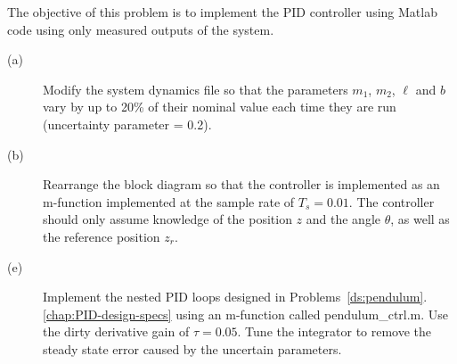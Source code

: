 The objective of this problem is to implement the PID controller using Matlab code using only measured outputs of the system.
\begin{description}
\item[(a)]  Modify the system dynamics file so that the parameters $m_1$, $m_2$, $\ell$ and $b$ vary by up to 20\% of their nominal value each time they are run (uncertainty parameter = 0.2).
\item[(b)]  Rearrange the block diagram so that the controller is implemented as an m-function implemented at the sample rate of $T_s=0.01$.  The controller should only assume knowledge of the position $z$ and the angle $\theta$, as well as the reference position $z_r$.
\item[(e)]  Implement the nested PID loops designed in Problems~\ref{ds:pendulum}.\ref{chap:PID-design-specs} using an m-function called pendulum\_ctrl.m.   Use the dirty derivative gain of $\tau=0.05$. Tune the integrator to remove the steady state error caused by the uncertain parameters.
\end{description}

